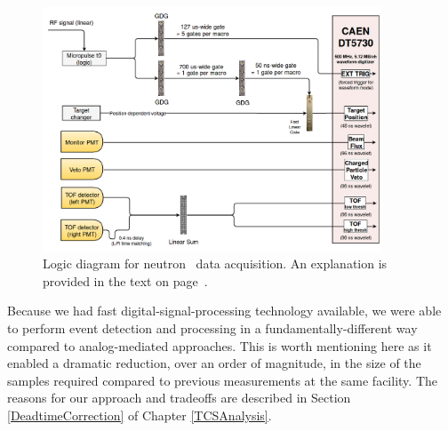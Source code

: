 \begin{figure}
    \centering
    \includegraphics[width=0.9\textwidth]{figures/TCSLogicDiagram.png}
    \caption[Logic diagram for neutron \tot\ data acquisition]
    {Logic diagram for neutron \tot\ data acquisition. An explanation is provided in the text on
    page~\pageref{DataAcquisition}.}
    \label{TCSLogicDiagram}
\end{figure}

Because we had fast digital-signal-processing technology available, we were able
to perform event detection and processing in a fundamentally-different way
compared to analog-mediated approaches. This is worth mentioning
here as it enabled a dramatic reduction, over an order of magnitude, in the size of the
samples required compared to previous measurements at the same facility. The reasons
for our approach and tradeoffs are
described in Section \ref{DeadtimeCorrection} of Chapter \ref{TCSAnalysis}.

\afterpage{\clearpage}
